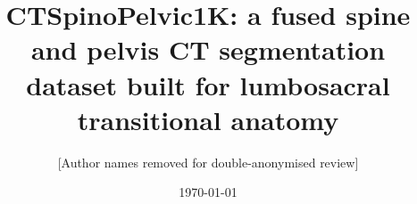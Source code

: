 \documentclass[aapm,mph,amsmath,amssymb,reprint,linenumbers]{revtex4-2}
\begin{document}
\title{CTSpinoPelvic1K: a fused spine and pelvis CT segmentation dataset
       built for lumbosacral transitional anatomy}

\author{[Author names removed for double-anonymised review]}

\date{\today}
\end{document}
